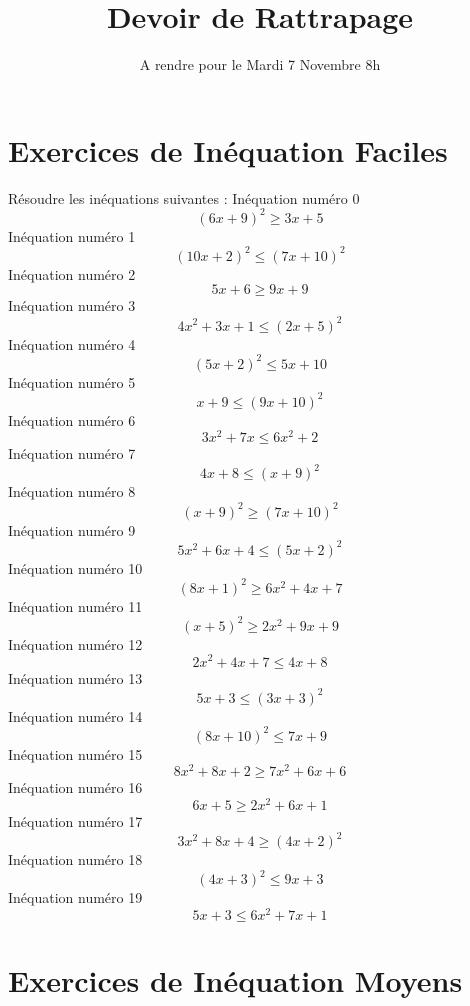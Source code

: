 \documentclass{article}
\title{Devoir de Rattrapage}
\date{A rendre pour le Mardi 7 Novembre 8h}\usepackage{natbib}
\begin{document}
\maketitle
 \section{Exercices de In\'equation Faciles}

 R\'esoudre les in\'equations suivantes : 
In\'equation num\'ero 0 \[\left(6 x + 9\right)^{2} \geq 3 x + 5\]In\'equation num\'ero 1 \[\left(10 x + 2\right)^{2} \leq \left(7 x + 10\right)^{2}\]In\'equation num\'ero 2 \[5 x + 6 \geq 9 x + 9\]In\'equation num\'ero 3 \[4 x^{2} + 3 x + 1 \leq \left(2 x + 5\right)^{2}\]In\'equation num\'ero 4 \[\left(5 x + 2\right)^{2} \leq 5 x + 10\]In\'equation num\'ero 5 \[x + 9 \leq \left(9 x + 10\right)^{2}\]In\'equation num\'ero 6 \[3 x^{2} + 7 x \leq 6 x^{2} + 2\]In\'equation num\'ero 7 \[4 x + 8 \leq \left(x + 9\right)^{2}\]In\'equation num\'ero 8 \[\left(x + 9\right)^{2} \geq \left(7 x + 10\right)^{2}\]In\'equation num\'ero 9 \[5 x^{2} + 6 x + 4 \leq \left(5 x + 2\right)^{2}\]In\'equation num\'ero 10 \[\left(8 x + 1\right)^{2} \geq 6 x^{2} + 4 x + 7\]In\'equation num\'ero 11 \[\left(x + 5\right)^{2} \geq 2 x^{2} + 9 x + 9\]In\'equation num\'ero 12 \[2 x^{2} + 4 x + 7 \leq 4 x + 8\]In\'equation num\'ero 13 \[5 x + 3 \leq \left(3 x + 3\right)^{2}\]In\'equation num\'ero 14 \[\left(8 x + 10\right)^{2} \leq 7 x + 9\]In\'equation num\'ero 15 \[8 x^{2} + 8 x + 2 \geq 7 x^{2} + 6 x + 6\]In\'equation num\'ero 16 \[6 x + 5 \geq 2 x^{2} + 6 x + 1\]In\'equation num\'ero 17 \[3 x^{2} + 8 x + 4 \geq \left(4 x + 2\right)^{2}\]In\'equation num\'ero 18 \[\left(4 x + 3\right)^{2} \leq 9 x + 3\]In\'equation num\'ero 19 \[5 x + 3 \leq 6 x^{2} + 7 x + 1\]
 \section{Exercices de In\'equation Moyens}
\end{document}
